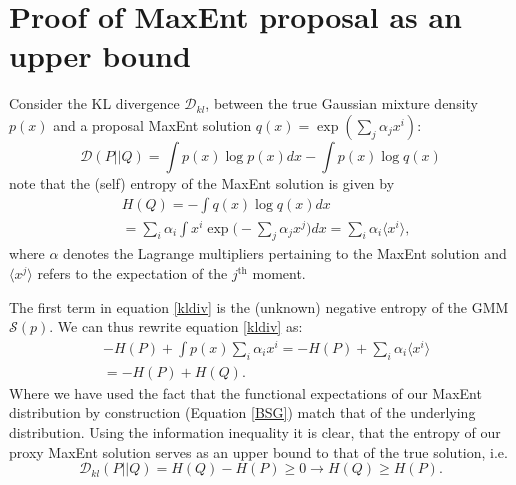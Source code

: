 \documentclass[journal]{IEEEtran}
\begin{document}
	\section{Proof of MaxEnt proposal as an upper bound}
	\label{mainresults}
	Consider the KL divergence $\mathcal{D}_{kl}$, \cite{cover2012elements} between the true Gaussian mixture density $p(x)$ and a proposal MaxEnt solution $q(x) = \exp(\sum_{j}\alpha_{j}x^{i})$:
	\begin{equation}
	\label{kldiv}
	\mathcal{D}(P||Q) = \int p(x)\log p(x)dx - \int p(x)\log q(x) 
	\end{equation} note that the (self) entropy of the MaxEnt solution is given by
	\begin{equation}
	\begin{aligned}
	\label{ent1}
	& H(Q) = -\int q(x)\log q(x) dx \\
	&= \sum_{i}\alpha_{i}\int x^{i}\exp\bigg(-\sum_{j}\alpha_{j}x^{j}\bigg)dx = \sum_{i}\alpha_{i}\langle x^{i} \rangle,
	\end{aligned}
	\end{equation}
	where $\alpha$ denotes the Lagrange multipliers pertaining to the MaxEnt solution and $\langle x^{j} \rangle$ refers to the expectation of the $j^{\text{th}}$ moment. 
	
	The first term in equation \eqref{kldiv} is the (unknown) negative entropy of the GMM $\mathcal{S}(p)$. We can thus rewrite equation \eqref{kldiv} as:
	\begin{equation}
	\label{sumentropies}
	\begin{aligned}
	&-H(P) + \int p(x)\sum_{i}\alpha_{i}x^{i} = -H(P) + \sum_{i}\alpha_{i}\langle x^{i} \rangle \\
	& = -H(P) + H(Q).
	\end{aligned}
	\end{equation} 
	Where we have used the fact that the functional expectations of our MaxEnt distribution by construction (Equation \eqref{BSG}) match that of the underlying distribution.  Using the information inequality \cite{cover2012elements} it is clear, that the entropy of our proxy MaxEnt solution serves as an upper bound to that of the true solution, i.e.
	\begin{equation}
	\label{dataprocessesing}
	\mathcal{D}_{kl}(P||Q) = H(Q) -H(P) \geq 0 \rightarrow H(Q) \geq H(P).
	\end{equation}
	
\end{document}
